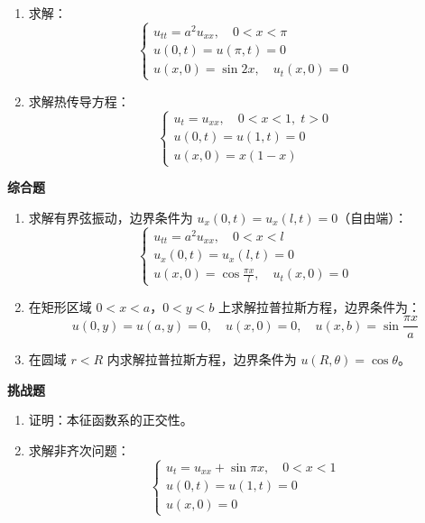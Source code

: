 \begin{enumerate}
    \item 求解：
    \begin{equation}
        \begin{cases}
            u_{tt} = a^2 u_{xx}, \quad 0 < x < \pi \\
            u(0, t) = u(\pi, t) = 0 \\
            u(x, 0) = \sin 2x, \quad u_t(x, 0) = 0
        \end{cases}
    \end{equation}
    
    \item 求解热传导方程：
    \begin{equation}
        \begin{cases}
            u_t = u_{xx}, \quad 0 < x < 1, \; t > 0 \\
            u(0, t) = u(1, t) = 0 \\
            u(x, 0) = x(1-x)
        \end{cases}
    \end{equation}
\end{enumerate}

\textbf{综合题}

\begin{enumerate}[resume]
    \item 求解有界弦振动，边界条件为 $u_x(0, t) = u_x(l, t) = 0$（自由端）：
    \begin{equation}
        \begin{cases}
            u_{tt} = a^2 u_{xx}, \quad 0 < x < l \\
            u_x(0, t) = u_x(l, t) = 0 \\
            u(x, 0) = \cos\frac{\pi x}{l}, \quad u_t(x, 0) = 0
        \end{cases}
    \end{equation}
    
    \item 在矩形区域 $0 < x < a$，$0 < y < b$ 上求解拉普拉斯方程，边界条件为：
    \begin{equation}
        u(0, y) = u(a, y) = 0, \quad u(x, 0) = 0, \quad u(x, b) = \sin\frac{\pi x}{a}
    \end{equation}
    
    \item 在圆域 $r < R$ 内求解拉普拉斯方程，边界条件为 $u(R, \theta) = \cos\theta$。
\end{enumerate}

\textbf{挑战题}

\begin{enumerate}[resume]
    \item 证明：本征函数系的正交性。
    
    \item 求解非齐次问题：
    \begin{equation}
        \begin{cases}
            u_t = u_{xx} + \sin\pi x, \quad 0 < x < 1 \\
            u(0, t) = u(1, t) = 0 \\
            u(x, 0) = 0
        \end{cases}
    \end{equation}
\end{enumerate}
